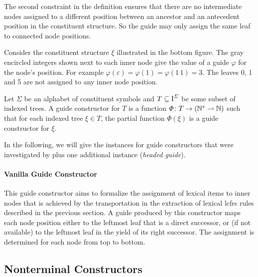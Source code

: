 \documentclass[../document.tex]{subfiles}
\begin{document}
    The second constraint in the definition ensures that there are no intermediate nodes assigned to a different position between an ancestor and an antecedent position in the constituent structure.
    So the guide may only assign the same leaf to connected node positions.

    \begin{example}
        Consider the constituent structure \(\xi\) illustrated in the bottom figure.
        The gray encircled integers shown next to each inner node give the value of a guide \(\varphi\) for the node's position.
        For example \(\varphi(\varepsilon) = \varphi(1) = \varphi(1\,1) = 3\).
        The leaves 0, 1 and 5 are not assigned to any inner node position.

        \begin{center}
            
        \end{center}
    \end{example}

    \begin{definition}
        Let \(\varSigma\) be an alphabet of constituent symbols and \(T \subseteq \operatorname{I}^\varSigma\) be some subset of indexed trees.
        A guide constructor for \(T\) is a function \(\varPhi\colon T \to (\mathbb{N}^* \rightharpoonup \mathbb{N})\) such that for each indexed tree \(\xi \in T\), the partial function \(\varPhi(\xi)\) is a guide constructor for \(\xi\).
    \end{definition}

    In the following, we will give the instances for guide constructors that were investigated by \citet{Rup22} plus one additional instance (\emph{headed guide}).

    \paragraph{Vanilla Guide Constructor}
    This guide constructor aims to formalize the assignment of lexical items to inner nodes that is achieved by the transportation in the extraction of lexical \gls*{lcfrs} rules described in the previous section.
    A guide produced by this constructor maps each node position either to the leftmost leaf that is a direct successor, or (if not available) to the leftmost leaf in the yield of its right successor.
    The assignment is determined for each node from top to bottom.

    \subsection{Nonterminal Constructors}
\end{document}
